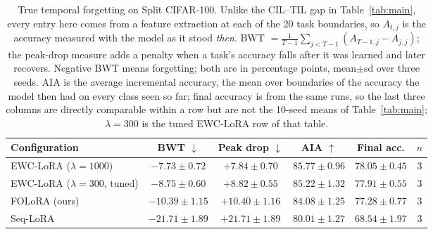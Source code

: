 \begin{table}[htbp]
\centering
\footnotesize
\setlength{\tabcolsep}{2pt}
\caption{True temporal forgetting on Split CIFAR-100. Unlike the CIL--TIL gap in Table~\ref{tab:main}, every entry here comes from a feature extraction at each of the 20 task boundaries, so $A_{t,j}$ is the accuracy measured with the model as it stood \emph{then}. BWT $=\frac{1}{T-1}\sum_{j<T-1}(A_{T-1,j}-A_{j,j})$; the peak-drop measure adds a penalty when a task's accuracy falls after it was learned and later recovers. Negative BWT means forgetting; both are in percentage points, mean$\pm$sd over three seeds. AIA is the average incremental accuracy, the mean over boundaries of the accuracy the model then had on every class seen so far; final accuracy is from the same runs, so the last three columns are directly comparable within a row but are not the 10-seed means of Table~\ref{tab:main}; $\lambda{=}300$ is the tuned EWC-LoRA row of that table.}
\label{tab:bwt}
\begin{tabular}{lccccc}
\toprule
Configuration & BWT $\downarrow$ & Peak drop $\downarrow$ & AIA $\uparrow$ & Final acc. & $n$ \\
\midrule
EWC-LoRA ($\lambda{=}1000$) & $-7.73\pm0.72$ & $+7.84\pm0.70$ & $85.77\pm0.96$ & $78.05\pm0.45$ & 3 \\
EWC-LoRA ($\lambda{=}300$, tuned) & $-8.75\pm0.60$ & $+8.82\pm0.55$ & $85.22\pm1.32$ & $77.91\pm0.55$ & 3 \\
FOLoRA (ours) & $-10.39\pm1.15$ & $+10.40\pm1.16$ & $84.08\pm1.25$ & $77.28\pm0.77$ & 3 \\
Seq-LoRA & $-21.71\pm1.89$ & $+21.71\pm1.89$ & $80.01\pm1.27$ & $68.54\pm1.97$ & 3 \\
\bottomrule
\end{tabular}
\end{table}
